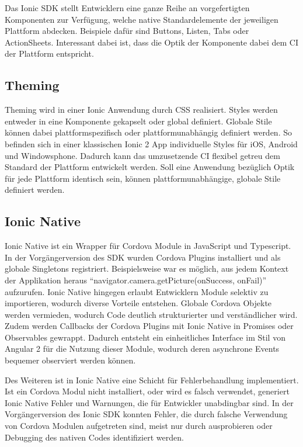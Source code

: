 Das Ionic \ac{SDK} stellt Entwicklern eine ganze Reihe an vorgefertigten Komponenten zur Verfügung,
welche native Standardelemente der jeweiligen Plattform abdecken. Beispiele dafür sind Buttons, Listen, Tabs oder ActionSheets.
Interessant dabei ist, dass die Optik der Komponente dabei dem \ac{CI} der Plattform entspricht.
\cite{ionic99:online}

\subsection{Theming}
Theming wird in einer Ionic Anwendung durch \ac{CSS} realisiert.
Styles werden entweder in eine Komponente gekapselt oder global definiert.
Globale Stile können dabei plattformspezifisch oder plattformunabhängig definiert werden.
So befinden sich in einer klassischen Ionic 2 App individuelle Styles für iOS, Android und Windowsphone.
Dadurch kann das umzusetzende \ac{CI} flexibel getreu dem Standard der Plattform entwickelt werden.
Soll eine Anwendung bezüglich Optik für jede Plattform identisch sein,
können plattformunabhängige, globale Stile definiert werden.
\cite{ionic73:online}


\subsection{Ionic Native}

Ionic Native ist ein Wrapper für Cordova Module in JavaScript und Typescript.
In der Vorgängerversion des \ac{SDK} wurden Cordova Plugins installiert und als globale Singletons registriert.
Beispielsweise war es möglich, aus jedem Kontext der Applikation heraus ``navigator.camera.getPicture(onSuccess, onFail)'' aufzurufen.
Ionic Native hingegen erlaubt Entwicklern Module selektiv zu importieren, wodurch diverse Vorteile entstehen.
Globale Cordova Objekte werden vermieden, wodurch Code deutlich strukturierter und verständlicher wird.
Zudem werden Callbacks der Cordova Plugins mit Ionic Native in Promises oder Observables gewrappt.
Dadurch entsteht ein einheitliches Interface im Stil von Angular 2 für die Nutzung dieser Module,
wodurch deren asynchrone Events bequemer observiert werden können.

Des Weiteren ist in Ionic Native eine Schicht für Fehlerbehandlung implementiert.
Ist ein Cordova Modul nicht installiert, oder wird es falsch verwendet,
generiert Ionic Native Fehler und Warnungen, die für Entwickler unabdingbar sind.
In der Vorgängerversion des Ionic \ac{SDK} konnten Fehler, die durch falsche Verwendung von
Cordova Modulen aufgetreten sind, meist nur durch ausprobieren oder Debugging des nativen Codes identifiziert werden.
\cite{ionic55:online}


